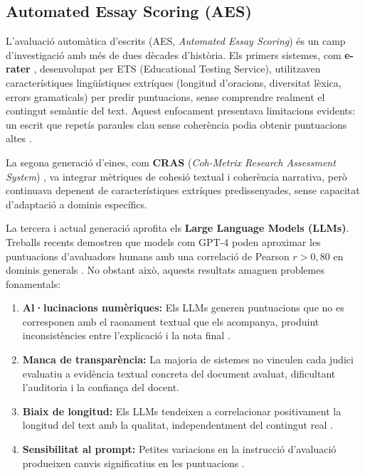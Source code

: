 \documentclass[12pt,a4paper,twoside]{report}
\begin{document}
\subsection{Automated Essay Scoring (AES)}
\label{subsec:aes}

L'avaluaci\'o autom\`atica d'escrits (AES, \textit{Automated Essay Scoring}) \'es un camp d'investigaci\'o amb m\'es de dues d\`ecades d'hist\`oria. Els primers sistemes, com \textbf{e-rater} \cite{burstein2013}, desenvolupat per ETS (Educational Testing Service), utilitzaven caracter\'istiques ling\"u\'istiques extr\'iques (longitud d'oracions, diversitat l\`exica, errors gramaticals) per predir puntuacions, sense comprendre realment el contingut sem\`antic del text. Aquest enfocament presentava limitacions evidents: un escrit que repet\'is paraules clau sense coher\`encia podia obtenir puntuacions altes \cite{perelman2014}.

La segona generaci\'o d'eines, com \textbf{CRAS} (\textit{Coh-Metrix Research Assessment System}) \cite{graesser2014}, va integrar m\`etriques de cohesi\'o textual i coher\`encia narrativa, per\`o continuava depenent de caracter\'istiques extr\'iques predissenyades, sense capacitat d'adaptaci\'o a dominis espec\'ifics.

La tercera i actual generaci\'o aprofita els \textbf{Large Language Models (LLMs)}. Treballs recents demostren que models com GPT-4 poden aproximar les puntuacions d'avaluadors humans amb una correlaci\'o de Pearson $r > 0{,}80$ en dominis generals \cite{guo2024}. No obstant aix\`o, aquests resultats amaguen problemes fonamentals:

\begin{enumerate}
    \item \textbf{Al·lucinacions num\`eriques:} Els LLMs generen puntuacions que no es corresponen amb el raonament textual que els acompanya, produint inconsist\`encies entre l'explicaci\'o i la nota final \cite{guo2024}.
    \item \textbf{Manca de transpar\`encia:} La majoria de sistemes no vinculen cada judici evaluatiu a evid\`encia textual concreta del document avaluat, dificultant l'auditoria i la confian\c{c}a del docent.
    \item \textbf{Biaix de longitud:} Els LLMs tendeixen a correlacionar positivament la longitud del text amb la qualitat, independentment del contingut real \cite{perelman2014}.
    \item \textbf{Sensibilitat al prompt:} Petites variacions en la instrucci\'o d'avaluaci\'o produeixen canvis significatius en les puntuacions \cite{guo2024}.
\end{enumerate}
\end{document}
